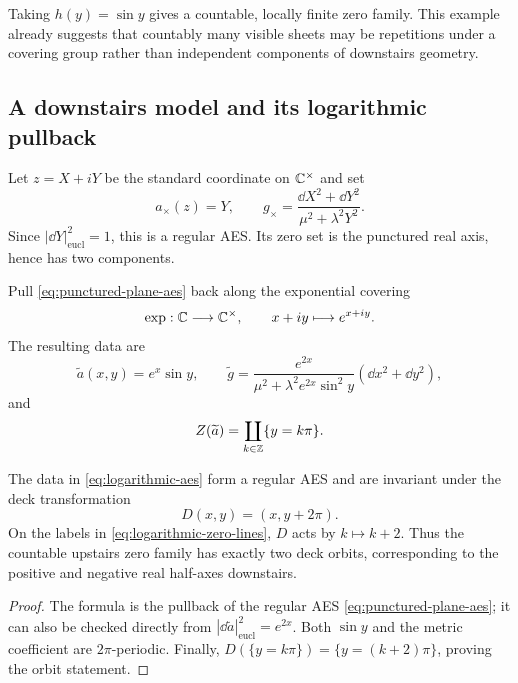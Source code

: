 Taking $h(y)=\sin y$ gives a countable, locally finite zero family.  This example
already suggests that countably many visible sheets may be repetitions under a
covering group rather than independent components of downstairs geometry.

\subsection{A downstairs model and its logarithmic pullback}

Let $z=X+iY$ be the standard coordinate on $\mathbb{C}^\times$ and set
\begin{equation}
 a_\times(z)=Y,
 \qquad
 g_\times=\frac{\dd X^2+\dd Y^2}{\mu^2+\lambda^2Y^2}.
 \label{eq:punctured-plane-aes}
\end{equation}
Since $|\dd Y|^2_{\mathrm{eucl}}=1$, this is a regular AES.  Its zero set is the
punctured real axis, hence has two components.

Pull \eqref{eq:punctured-plane-aes} back along the exponential covering
\[
 \exp:\mathbb{C}\longrightarrow\mathbb{C}^\times,
 \qquad x+iy\longmapsto e^{x+iy}.
\]
The resulting data are
\begin{equation}
 \widetilde a(x,y)=e^x\sin y,
 \qquad
 \widetilde g=
 \frac{e^{2x}}
      {\mu^2+\lambda^2e^{2x}\sin^2y}
 (\dd x^2+\dd y^2),
 \label{eq:logarithmic-aes}
\end{equation}
and
\begin{equation}
 Z(\widetilde a)=\coprod_{k\in\mathbb{Z}}\{y=k\pi\}.
 \label{eq:logarithmic-zero-lines}
\end{equation}

\begin{theorem}
\label{thm:logarithmic-zero-lift}
The data in \eqref{eq:logarithmic-aes} form a regular AES and are invariant under
the deck transformation
\[
 D(x,y)=(x,y+2\pi).
\]
On the labels in \eqref{eq:logarithmic-zero-lines}, $D$ acts by $k\mapsto k+2$.
Thus the countable upstairs zero family has exactly two deck orbits, corresponding
to the positive and negative real half-axes downstairs.
\end{theorem}

\begin{proof}
The formula is the pullback of the regular AES
\eqref{eq:punctured-plane-aes}; it can also be checked directly from
$|\dd\widetilde a|^2_{\mathrm{eucl}}=e^{2x}$.  Both $\sin y$ and the metric
coefficient are $2\pi$-periodic.  Finally,
$D(\{y=k\pi\})=\{y=(k+2)\pi\}$, proving the orbit statement.
\end{proof}

